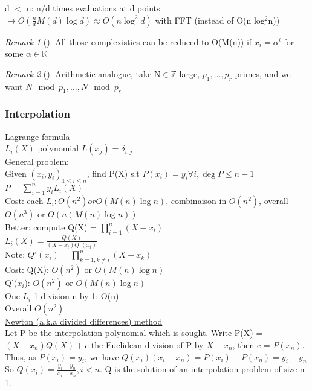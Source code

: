 \documentclass{article}
\theoremstyle{definition}
\theoremstyle{remark}
\newtheorem*{remark}{Remark}
\newcommand{\Rem}[3]{\begin{remark}[#1]\label{#2}#3\end{remark}}
\newcommand{\Z}{\mathbb{Z}}
\newcommand{\K}{\mathbb{K}}
\begin{document}
d $<$ n: n/d times evaluations at d points $\rightarrow O(\frac{n}{d}M(d)\log d) \approx O(n \log^2d)$ with FFT (instead of O(n log$^2$n))

\Rem{}{}{All those complexisties can be reduced to O(M(n)) if $x_i = \alpha^i$ for some $\alpha\in\K$}

\Rem{}{}{Arithmetic analogue, take N$\in\Z$ large, $p_1,\dots,p_r$ primes, and we want $N \mod p_1,\dots,N \mod p_r$}

\subsubsection{Interpolation}
\underline{Lagrange formula}\\
$L_i(X)$ polynomial $L(x_j) = \delta_{i,j}$\\

General problem:\\
Given $(x_i,y_i)_{1\leq i\leq n}$, find P(X) s.t $P(x_i) = y_i \forall i,\deg P \leq n-1$\\

$P = \sum_{i = 1}^{n}y_i L_i(X)$\\
Cost: each $L_i: O(n^2) or O(M(n)\log n)$, combinaison in $O(n^2)$, overall $O(n^3)$ or $O(n(M(n)\log n))$\\

Better: compute Q(X) = $\prod\limits_{i=1}^{n}(X-x_i)$\\
$L_i(X) = \frac{Q(X)}{(X-x_i)Q'(x_i)}$\\

Note: $Q'(x_i) = \prod\limits_{k=1,k\neq i}^{n}(X-x_k)$\\

Cost: Q(X): $O(n^2)$ or $O(M(n)\log n)$\\
Q'($x_i$): $O(n^2)$ or $O(M(n)\log n)$\\
One $L_i$ 1 division n by 1: O(n)\\
Overall $O(n^2)$\\

\underline{Newton (a.k.a divided differences) method}\\
Let P be the interpolation polynomial which is sought. Write P(X) = $(X - x_n)Q(X) + c$ the Euclidean division of P by $X - x_n$, then c = $P(x_n)$. Thus, as $P(x_i) = y_i$, we have $Q(x_i)(x_i-x_n) = P(x_i) - P(x_n) = y_i - y_n$\\

So $Q(x_i) = \frac{y_i - y_n}{x_i - x_n}, i < n$. Q is the solution of an interpolation problem of size n-1.\\
\end{document}
